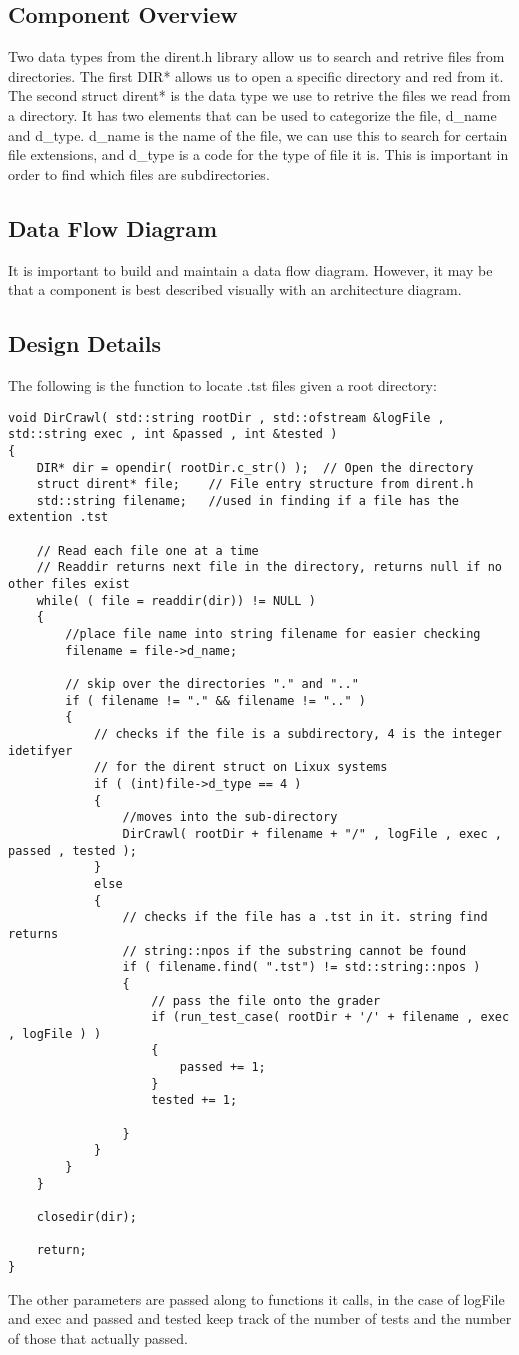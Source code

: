 \subsection{Component  Overview}
Two data types from the dirent.h library allow us to search and retrive files from directories.  The first DIR* allows us to open
a specific directory and red from it.  The second struct dirent* is the data type we use to retrive the files we read from a directory.
It has two elements that can be used to categorize the file, d\_name and d\_type.  d\_name is the name of the file, we can use this
to search for certain file extensions, and d\_type is a code for the type of file it is.  This is important in order to find which files are
subdirectories. 

\subsection{Data Flow Diagram}
It is important to build and maintain a data flow diagram.  However, it may be 
that a component is best described visually with an architecture diagram. 


\subsection{Design Details}
The following is the function to locate .tst files given a root directory:
\begin{lstlisting}
void DirCrawl( std::string rootDir , std::ofstream &logFile , std::string exec , int &passed , int &tested )
{
	DIR* dir = opendir( rootDir.c_str() );	// Open the directory
	struct dirent* file;	// File entry structure from dirent.h
	std::string filename;	//used in finding if a file has the extention .tst

	// Read each file one at a time
	// Readdir returns next file in the directory, returns null if no other files exist
	while( ( file = readdir(dir)) != NULL )
	{
		//place file name into string filename for easier checking
		filename = file->d_name;

		// skip over the directories "." and ".."
		if ( filename != "." && filename != ".." )
		{
			// checks if the file is a subdirectory, 4 is the integer idetifyer
			// for the dirent struct on Lixux systems
			if ( (int)file->d_type == 4 )
			{
				//moves into the sub-directory
                DirCrawl( rootDir + filename + "/" , logFile , exec , passed , tested );
			}
			else
			{
				// checks if the file has a .tst in it. string find returns
				// string::npos if the substring cannot be found
				if ( filename.find( ".tst") != std::string::npos )
				{
					// pass the file onto the grader 
                    if (run_test_case( rootDir + '/' + filename , exec , logFile ) )
					{
						passed += 1;
					}
					tested += 1;

				}
			}
		}
	}

	closedir(dir);

	return;
}
\end{lstlisting}
The other parameters are passed along to functions it calls, in the case of logFile and exec and passed and tested 
keep track of the number of tests and the number of those that actually passed.


